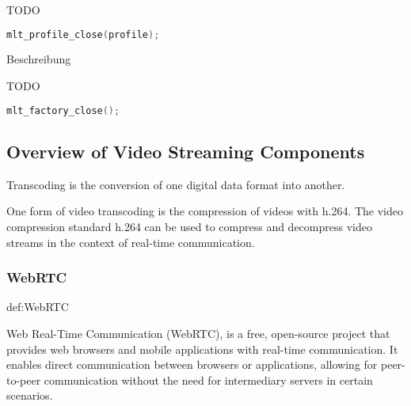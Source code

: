 \documentclass[../MasterThesis.tex]{subfiles}
\begin{document}
\begin{description}[font=\normalfont\color{RedViolet!80!black}, style=nextline]
	TODO
	
	\begin{lstlisting}[language=C, numbers=none, basicstyle=\scriptsize\ttfamily]
	mlt_profile_close(profile); \end{lstlisting}
	
	
	
	\item[Close the factory] Beschreibung
	
	TODO
	
	\begin{lstlisting}[language=C, numbers=none, basicstyle=\scriptsize\ttfamily]
	mlt_factory_close();
	\end{lstlisting}
	
	
\end{description}












\subsection{Overview of Video Streaming Components}
\label{subsection_OverviewVideoStreamingComponents}


Transcoding is the conversion of one digital data format into another.~\cite{transcoding}

One form of video transcoding is the compression of videos with h.264.
The video compression standard h.264 can be used to compress and decompress video streams in the context of real-time communication.~\cite{transcoding}
	









\subsubsection*{WebRTC} 

\begin{CountingDefinition}[WebRTC]{def:WebRTC}
	
	Web Real-Time Communication (WebRTC), is a free, open-source project that provides web browsers and mobile applications with real-time communication. It enables direct communication between browsers or applications, allowing for peer-to-peer communication without the need for intermediary servers in certain scenarios.
	
\end{CountingDefinition}
\end{document}
